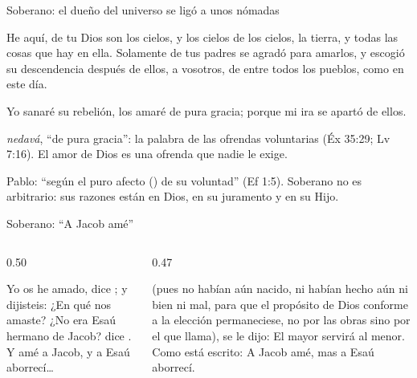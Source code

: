\begin{frame}{Soberano: el dueño del universo se ligó a unos nómadas}
\begin{cita}He aquí, de \SENOR{} tu Dios son los cielos, y los cielos de los cielos, la tierra, y todas las cosas que hay en ella. Solamente de tus padres se agradó \SENOR{} para amarlos, y escogió su descendencia después de ellos, a vosotros, de entre todos los pueblos, como en este día.\end{cita}
\begin{cita}Yo sanaré su rebelión, los amaré de pura gracia; porque mi ira se apartó de ellos.\end{cita}
\small{} \emph{nedavá}, ``de pura gracia'': la palabra de las ofrendas voluntarias (Éx 35:29; Lv 7:16). El amor de Dios es una ofrenda que nadie le exige.\par\smallskip
\scriptsize Pablo: ``según el puro afecto () de su voluntad'' (Ef 1:5). Soberano no es arbitrario: sus razones están en Dios, en su juramento y en su Hijo.
\end{frame}

\begin{frame}{Soberano: ``A Jacob amé''}
\begin{columns}[t,onlytextwidth]
\begin{column}{0.50\textwidth}
\begin{center}\end{center}
\begin{cita}Yo os he amado, dice \SENOR; y dijisteis: ¿En qué nos amaste? ¿No era Esaú hermano de Jacob? dice \SENOR. Y amé a Jacob, y a Esaú aborrecí\ldots{}\end{cita}
\end{column}
\begin{column}{0.47\textwidth}
\begin{cita}(pues no habían aún nacido, ni habían hecho aún ni bien ni mal, para que el propósito de Dios conforme a la elección permaneciese, no por las obras sino por el que llama), se le dijo: El mayor servirá al menor. Como está escrito: A Jacob amé, mas a Esaú aborrecí.\end{cita}
\end{column}
\end{columns}
\end{frame}


